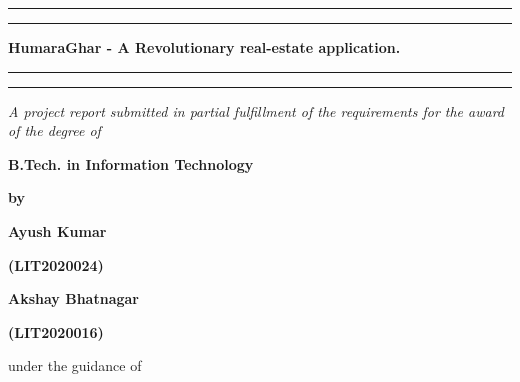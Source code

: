 \thispagestyle{empty}

\setcounter{page}{1}

\def\thepage{\roman{page}}

\begin{center}

    \rule[0.5ex]{\linewidth}{2pt}\vspace*{-\baselineskip}\vspace*{3.2pt}
    \rule[0.5ex]{\linewidth}{2pt}

    \vspace*{3.2pt}

    {\Large\bf HumaraGhar - A Revolutionary real-estate application.}

    \vspace*{3.2pt}

    \rule[0.5ex]{\linewidth}{2pt}\vspace*{-\baselineskip}\vspace*{3.2pt}
    \rule[0.5ex]{\linewidth}{2pt}

    \vspace{1.5cm}

    \textit{{A project report submitted in partial fulfillment of the requirements
                for the award of the degree of}}

    \vspace{1cm}

    {\bf B.Tech. in Information Technology}

    \vspace{0.5cm}

    {\bf by}

    \vspace{0.5cm}

    {\bf {Ayush Kumar}}

    \vspace{0.1cm}

    {\bf {(LIT2020024)}}

    \vspace{0.2cm}

    {\bf {Akshay Bhatnagar}}

    \vspace{0.1cm}

    {\bf {(LIT2020016)}}

    \vspace{1.1cm}

    {under the guidance of}

    \vspace{0.1cm}


\end{center}
